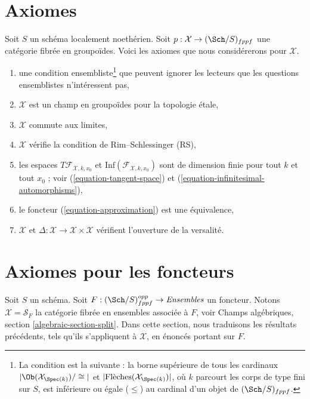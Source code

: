 \section{Axiomes}
\label{section-axioms}

\noindent
Soit $S$ un schéma localement noethérien. Soit
$p : \mathcal{X} \to (\Sch/S)_{fppf}$ une catégorie fibrée en groupoïdes.
Voici les axiomes que nous considérerons pour $\mathcal{X}$.
\begin{enumerate}
\item[{[-1]}] une condition ensembliste\footnote{La condition est la
suivante : la borne supérieure de tous les cardinaux
$|\Ob(\mathcal{X}_{\Spec(k)})/\cong|$ et
$|\text{Flèches}(\mathcal{X}_{\Spec(k)})|$, où $k$ parcourt les corps de
type fini sur $S$, est inférieure ou égale ($\leq$) au cardinal d'un
objet de $(\Sch/S)_{fppf}$.} que peuvent ignorer les
lecteurs que les questions ensemblistes n'intéressent pas,
\item[{[0]}] $\mathcal{X}$ est un champ en groupoïdes pour la topologie \'etale,
\item[{[1]}] $\mathcal{X}$ commute aux limites,
\item[{[2]}] $\mathcal{X}$ vérifie la condition de Rim--Schlessinger (RS),
\item[{[3]}] les espaces $T\mathcal{F}_{\mathcal{X}, k, x_0}$ et
$\text{Inf}(\mathcal{F}_{\mathcal{X}, k, x_0})$
sont de dimension finie
pour tout $k$ et tout $x_0$ ; voir
(\ref{equation-tangent-space}) et
(\ref{equation-infinitesimal-automorphisms}),
\item[{[4]}] le foncteur (\ref{equation-approximation}) est une équivalence,
\item[{[5]}] $\mathcal{X}$ et
$\Delta : \mathcal{X} \to \mathcal{X} \times \mathcal{X}$ vérifient
l'ouverture de la versalité.
\end{enumerate}
 
 
 
 
 
 




\section{Axiomes pour les foncteurs}
\label{section-axioms-functors}

\noindent
Soit $S$ un schéma. Soit $F : (\Sch/S)_{fppf}^{opp} \to \textit{Ensembles}$ un
foncteur. Notons $\mathcal{X} = \mathcal{S}_F$ la catégorie fibrée en ensembles
associée à $F$, voir Champs algébriques, section \ref{algebraic-section-split}.
Dans cette section, nous traduisons les résultats précédents, tels
qu'ils s'appliquent à $\mathcal{X}$, en énoncés portant sur $F$.

